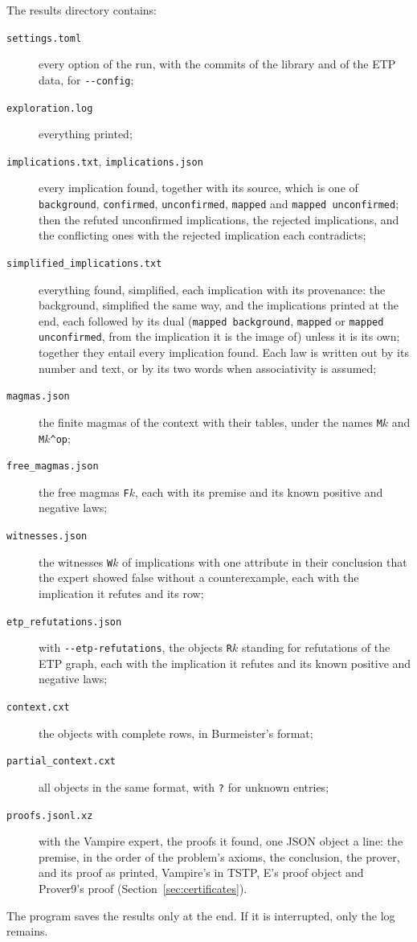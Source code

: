 \documentclass[11pt,a4paper]{article}
\theoremstyle{definition}
\theoremstyle{remark}
\newcommand{\code}[1]{\texttt{#1}}
\begin{document}
The results directory contains:
\begin{description}
  \item[\code{settings.toml}] every option of the run, with the commits of the library and of the ETP data, for \code{-{}-config};
  \item[\code{exploration.log}] everything printed;
  \item[\code{implications.txt}, \code{implications.json}] every implication found, together with its source, which is one of \code{background}, \code{confirmed}, \code{unconfirmed}, \code{mapped} and \code{mapped unconfirmed}; then the refuted unconfirmed implications, the rejected implications, and the conflicting ones with the rejected implication each contradicts;
  \item[\code{simplified\_implications.txt}] everything found, simplified, each implication with its provenance: the background, simplified the same way, and the implications printed at the end, each followed by its dual (\code{mapped background}, \code{mapped} or \code{mapped unconfirmed}, from the implication it is the image of) unless it is its own; together they entail every implication found. Each law is written out by its number and text, or by its two words when associativity is assumed;
  \item[\code{magmas.json}] the finite magmas of the context with their tables, under the names \code{M}$k$ and \code{M}$k$\code{\^{}op};
  \item[\code{free\_magmas.json}] the free magmas \code{F}$k$, each with its premise and its known positive and negative laws;
  \item[\code{witnesses.json}] the witnesses \code{W}$k$ of implications with one attribute in their conclusion that the expert showed false without a counterexample, each with the implication it refutes and its row;
  \item[\code{etp\_refutations.json}] with \code{-{}-etp-refutations}, the objects \code{R}$k$ standing for refutations of the ETP graph, each with the implication it refutes and its known positive and negative laws;
  \item[\code{context.cxt}] the objects with complete rows, in Burmeister's format;
  \item[\code{partial\_context.cxt}] all objects in the same format, with \code{?} for unknown entries;
  \item[\code{proofs.jsonl.xz}] with the Vampire expert, the proofs it found, one JSON object a line: the premise, in the order of the problem's axioms, the conclusion, the prover, and its proof as printed, Vampire's in TSTP, E's proof object and Prover9's proof (Section~\ref{sec:certificates}).
\end{description}
The program saves the results only at the end. If it is interrupted, only the log remains.
\end{document}
